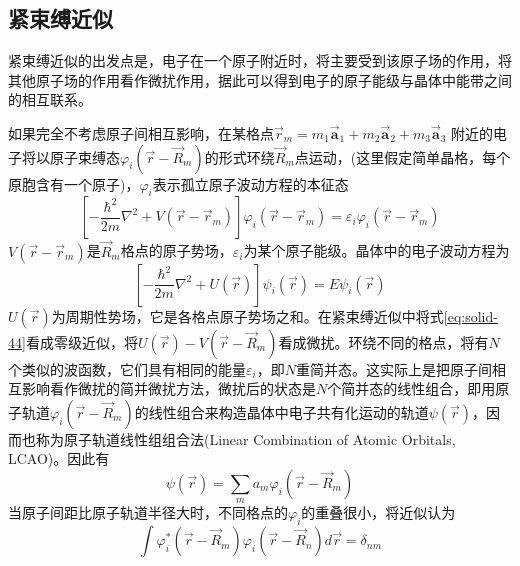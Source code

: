 \subsection{紧束缚近似}
紧束缚近似的出发点是，电子在一个原子附近时，将主要受到该原子场的作用，将其他原子场的作用看作微扰作用，据此可以得到电子的原子能级与晶体中能带之间的相互联系。


如果完全不考虑原子间相互影响，在某格点$\vec r_m=m_1\vec{\mathbf a}_1+m_2\vec{\mathbf a}_2+m_3\vec{\mathbf a}_3$
附近的电子将以原子束缚态$\varphi_i(\vec r-\vec R_m)$的形式环绕$\vec R_m$点运动，(这里假定简单晶格，每个原胞含有一个原子)，$\varphi_i$表示孤立原子波动方程的本征态
\begin{equation}
  \left[-\dfrac{\hbar^2}{2m}\nabla^2+V(\vec r-\vec r_m)\right]\varphi_i(\vec r-\vec r_m)=\varepsilon_i\varphi_i(\vec r-\vec r_m)
  \label{eq:solid-44}
\end{equation}
$V(\vec r-\vec r_m)$是$\vec R_m$格点的原子势场，$\varepsilon_i$为某个原子能级。晶体中的电子波动方程为
\begin{equation}
   \left[-\dfrac{\hbar^2}{2m}\nabla^2+U(\vec r)\right]\psi_i(\vec r)=E\psi_i(\vec r)
  \label{eq:solid-45}
\end{equation}
$U(\vec r)$为周期性势场，它是各格点原子势场之和。在紧束缚近似中将式\eqref{eq:solid-44}看成零级近似，将$U(\vec r)-V(\vec r-\vec R_m)$看成微扰。环绕不同的格点，将有$N$个类似的波函数，它们具有相同的能量$\varepsilon_i$，即$N$重简并态。这实际上是把原子间相互影响看作微扰的简并微扰方法，微扰后的状态是$N$个简并态的线性组合，即用原子轨道$\varphi_i(\vec r-\vec R_m)$的线性组合来构造晶体中电子共有化运动的轨道$\psi(\vec r)$，因而也称为原子轨道线性组组合法(Linear Combination of Atomic Orbitals, LCAO)。因此有
\begin{equation}
  \psi(\vec r)=\sum_ma_m\varphi_i(\vec r-\vec R_m)
  \label{eq:solid-46}
\end{equation}
当原子间距比原子轨道半径大时，不同格点的$\varphi_i$的重叠很小，将近似认为
\begin{displaymath}
  \int\varphi_i^{\ast}(\vec r-\vec R_m)\varphi_i(\vec r-\vec R_n)d\vec r=\delta_{nm}
\end{displaymath}

